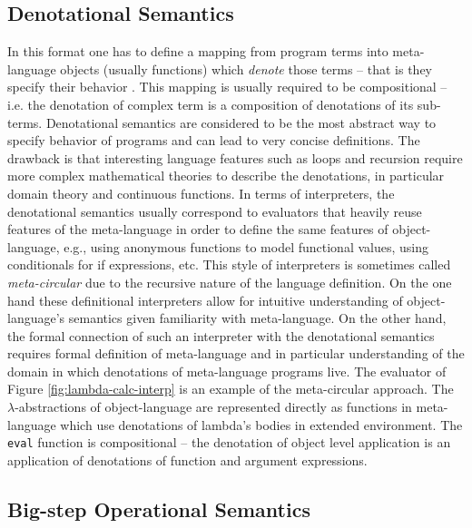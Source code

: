 \subsection*{Denotational Semantics}
In this format one has to define a mapping from program terms into meta-language objects (usually functions) which \emph{denote} those terms -- that is they specify their behavior \cite{scott-denotational-semantics}.
This mapping is usually required to be compositional -- i.e. the denotation of complex term is a composition of denotations of its sub-terms.
Denotational semantics are considered to be the most abstract way to specify behavior of programs and can lead to very concise definitions.
The drawback is that interesting language features such as loops and recursion require more complex mathematical theories to describe the denotations, in particular domain theory and continuous functions.
In terms of interpreters, the denotational semantics usually correspond to evaluators that heavily reuse features of the meta-language in order to define the same features of object-language, e.g., using anonymous functions to model functional values, using conditionals for if expressions, etc.
This style of interpreters is sometimes called \textit{meta-circular} due to the recursive nature of the language definition.
On the one hand these definitional interpreters allow for intuitive understanding of object-language's semantics given familiarity with meta-language.
On the other hand, the formal connection of such an interpreter with the denotational semantics requires formal definition of meta-language and in particular understanding of the domain in which denotations of meta-language programs live.
The evaluator of Figure \ref{fig:lambda-calc-interp} is an example of the meta-circular approach.
The $\lambda$-abstractions of object-language are represented directly as functions in meta-language which use denotations of lambda's bodies in extended environment.
The \lstinline!eval! function is compositional -- the denotation of object level application is an application of denotations of function and argument expressions.

\subsection*{Big-step Operational Semantics}

